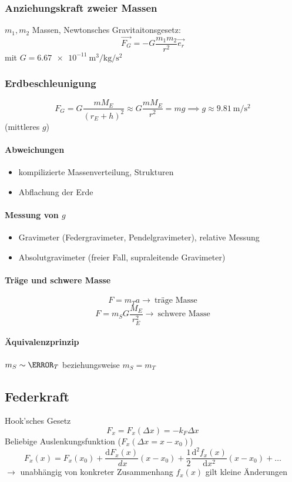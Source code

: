 \documentclass[a4paper]{scrartcl}
\renewcommand{\d}{\mathrm{d}}
\renewcommand{\v}[1]{\vec{#1}}
\newcommand{\dd}[2]{\frac{\d #1}{\ d#2}}
\theoremstyle{definition}
\theoremstyle{plain}
\theoremstyle{plain}
\theoremstyle{remark}
\theoremstyle{remark}
\theoremstyle{remark}
\begin{document}
\subsubsection{Anziehungskraft zweier Massen}
\label{sec-3-1-1}
$m_1,m_2$ Massen, Newtonsches Gravitaitonsgesetz:
\[\v{F_G} = -G\frac{m_1 m_2}{r^2}\v{e_r}\]
mit $G=\SI{6.67e-11}{\meter\cubed\per\kilo\gram\per\second\squared}$
\subsubsection{Erdbeschleunigung}
\label{sec-3-1-2}
\[F_G = G\frac{m M_E}{(r_E + h)^2} \approx G\frac{m M_E}{r^2} = m g \implies g\approx \SI{9.81}{\meter\per\second\squared}\]
(mittleres $g$) \\
\paragraph{Abweichungen}
\label{sec-3-1-2-1}
\begin{itemize}
\item kompilizierte Massenverteilung, Strukturen
\item Abflachung der Erde
\end{itemize}
\paragraph{Messung von $g$}
\label{sec-3-1-2-2}
\begin{itemize}
\item Gravimeter (Federgravimeter, Pendelgravimeter), relative Messung
\item Absolutgravimeter (freier Fall, supraleitende Gravimeter)
\end{itemize}
\paragraph{Träge und schwere Masse}
\label{sec-3-1-2-3}
\[F= m_T a \rightarrow ~\text{träge Masse}\]
\[F= m_S G\frac{M_E}{r_E^2} \rightarrow ~\text{schwere Masse}\]
\paragraph{Äquivalenzprinzip}
\label{sec-3-1-2-4}
$m_S \sim \m_T$ beziehungsweise $m_S = m_T$
\subsection{Federkraft}
\label{sec-3-2}
Hook'sches Gesetz
\[F_x = F_x(\Delta x) = -k_F \Delta x\]
Beliebige Auslenkungsfunktion ($F_x(\Delta x = x - x_0)$)
\[F_x(x) = F_x(x_0) + \dd{F_x(x)}{x}(x-x_0) + \frac{1}{2}\frac{\d^2 f_x(x)}{\d x^2}(x - x_0) + \ldots\]
$\rightarrow$ unabhängig von konkreter Zusammenhang $f_x(x)$ gilt kleine Änderungen
\end{document}
